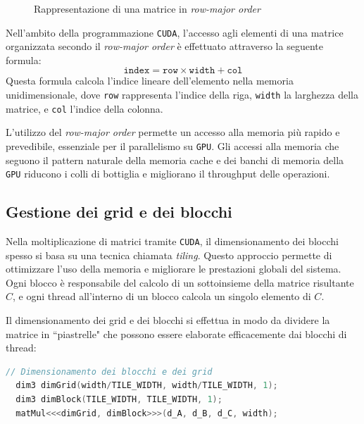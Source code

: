 \begin{figure}[H]
    \centering
      \caption{Rappresentazione di una matrice in \textit{row-major order}}
\end{figure}

Nell'ambito della programmazione \texttt{CUDA}, l'accesso agli elementi di
una matrice organizzata secondo il \textit{row-major order} è effettuato
attraverso la seguente formula:
\[
  \texttt{index} = \texttt{row} \times \texttt{width} + \texttt{col}
\]
Questa formula calcola l'indice lineare dell'elemento nella memoria
unidimensionale, dove \texttt{row} rappresenta l'indice della riga,
\texttt{width} la larghezza della matrice, e \texttt{col} l'indice
della colonna.

L'utilizzo del \textit{row-major order} permette un accesso alla memoria
più rapido e prevedibile, essenziale per il parallelismo su \texttt{GPU}.
Gli accessi alla memoria che seguono il pattern naturale della memoria cache
e dei banchi di memoria della \texttt{GPU} riducono i colli di bottiglia
e migliorano il throughput delle operazioni.


\subsection{Gestione dei grid e dei blocchi}
Nella moltiplicazione di matrici tramite \texttt{CUDA}, il dimensionamento
dei blocchi spesso si basa su una tecnica chiamata \textit{tiling}. Questo
approccio permette di ottimizzare l'uso della memoria e migliorare le prestazioni
globali del sistema. Ogni blocco è responsabile del calcolo di un sottoinsieme
della matrice risultante \(C\), e ogni thread all'interno di un blocco calcola
un singolo elemento di \(C\).

Il dimensionamento dei grid e dei blocchi si effettua in modo da dividere
la matrice in ``piastrelle" che possono essere elaborate efficacemente
dai blocchi di thread:

\begin{lstlisting}[language=C]
  // Dimensionamento dei blocchi e dei grid
  dim3 dimGrid(width/TILE_WIDTH, width/TILE_WIDTH, 1);
  dim3 dimBlock(TILE_WIDTH, TILE_WIDTH, 1);
  matMul<<<dimGrid, dimBlock>>>(d_A, d_B, d_C, width);
\end{lstlisting}

